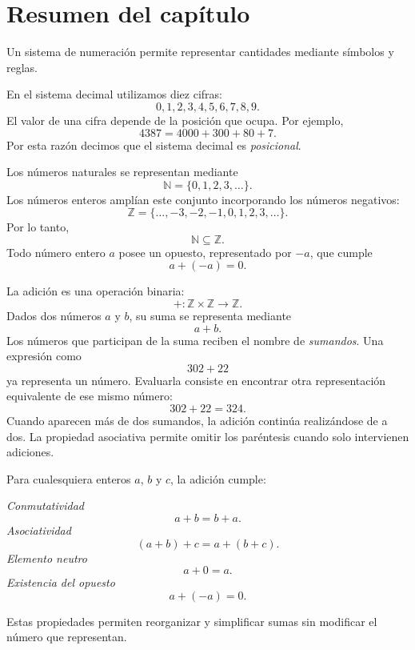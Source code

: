 \section{Resumen del capítulo}

\begin{tcolorbox}[resumen,title=Sistemas de numeración]
Un sistema de numeración permite representar cantidades mediante símbolos y reglas.

En el sistema decimal utilizamos diez cifras:
\[
0,1,2,3,4,5,6,7,8,9.
\]
El valor de una cifra depende de la posición que ocupa. Por ejemplo,
\[
4387=4000+300+80+7.
\]
Por esta razón decimos que el sistema decimal es \emph{posicional}.
\end{tcolorbox}

\begin{tcolorbox}[resumen,title=Números naturales y enteros]
Los números naturales se representan mediante
\[
\mathbb{N}=\{0,1,2,3,\ldots\}.
\]
Los números enteros amplían este conjunto incorporando los números negativos:
\[
\mathbb{Z}
=
\{\ldots,-3,-2,-1,0,1,2,3,\ldots\}.
\]
Por lo tanto,
\[
\mathbb{N}\subseteq\mathbb{Z}.
\]
Todo número entero \(a\) posee un opuesto, representado por \(-a\), que cumple
\[
a+(-a)=0.
\]
\end{tcolorbox}

\begin{tcolorbox}[resumen,title=Adición]
La adición es una operación binaria:
\[
+\colon\mathbb{Z}\times\mathbb{Z}\to\mathbb{Z}.
\]
Dados dos números \(a\) y \(b\), su suma se representa mediante
\[
a+b.
\]
Los números que participan de la suma reciben el nombre de \emph{sumandos}.
Una expresión como
\[
302+22
\]
ya representa un número. Evaluarla consiste en encontrar otra representación equivalente de ese mismo número:
\[
302+22=324.
\]
Cuando aparecen más de dos sumandos, la adición continúa realizándose de a dos. La propiedad asociativa permite omitir los paréntesis cuando solo intervienen adiciones.
\end{tcolorbox}

\begin{tcolorbox}[resumen,title=Propiedades de la adición]
Para cualesquiera enteros \(a\), \(b\) y \(c\), la adición cumple:
  
\textit{Conmutatividad}
\[
a+b=b+a.
\]
\textit{Asociatividad}
\[
(a+b)+c=a+(b+c).
\]
\textit{Elemento neutro}
\[
a+0=a.
\]
\textit{Existencia del opuesto}
\[
a+(-a)=0.
\]

Estas propiedades permiten reorganizar y simplificar sumas sin modificar el número que representan.
\end{tcolorbox}

